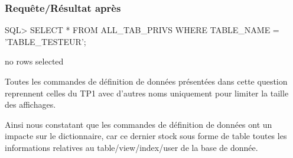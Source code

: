 \documentclass[•]{article}
\begin{document}
\subsubsection{Requête/Résultat après}
\begin{sql}
SQL>   SELECT * FROM ALL_TAB_PRIVS WHERE TABLE_NAME = 'TABLE_TESTEUR';

no rows selected
\end{sql}

Toutes les commandes de définition de données présentées dans cette question reprennent celles du TP1 avec d'autres noms uniquement pour limiter la taille des affichages.

Ainsi nous constatant que les commandes de définition de données ont un impacte sur le dictionnaire, car ce dernier stock sous forme de table toutes les informations relatives au table/view/index/user de la base de donnée.
\end{document}
